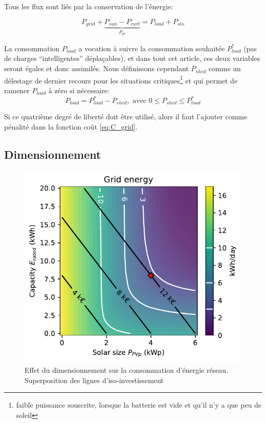 \documentclass[a4paper,10pt,twocolumn]{article}
\begin{document}
Tous les flux sont liés par la conservation de l'énergie:

\begin{equation}
  P_{grid} + \underbrace{P_{sun} - P_{curt}}_{P_{pv}} = P_{load} + P_{sto}
\end{equation}

La consommation $P_{load}$ a vocation à suivre la consommation souhaitée $P_{load}^*$
(pas de charges ``intelligentes'' déplaçables), et dans tout cet article, ces deux
variables seront égales et donc assimilés.
Nous définissons cependant $P_{shed}$ comme un délestage de dernier
recours pour les situations critiques\footnote{faible puissance souscrite, lorsque
la batterie est vide et qu'il n'y a que peu de soleil} et qui permet
de ramener $P_{load}$ à zéro si nécessaire:
%
\begin{equation}
  P_{load} = P_{load}^* - P_{shed}, \text{ avec } 0 \leq P_{shed} \leq P_{load}^*
\end{equation}

Si ce quatrième degré de liberté doit être utilisé,
alors il faut l'ajouter comme pénalité dans la fonction coût \eqref{eq:C_grid}.

\subsection{Dimensionnement}

\begin{figure}[!ht]
  \begin{center}
	  \includegraphics[width=0.8\columnwidth]{figures/Sizing_E_grid_invest_heatmap.pdf}
  \end{center}

  \caption{Effet du dimensionnement sur la consommation d'énergie réseau.
  Superposition des lignes d'iso-investissement
  }
  \label{fig:P_grid_map}
\end{figure}
\end{document}
